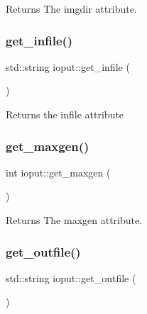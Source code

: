 \begin{DoxyReturn}{Returns}
The imgdir attribute. 
\end{DoxyReturn}
\mbox{\label{classioput_a7a165641e61846400db59840c5a6a160}} 
\subsubsection{\texorpdfstring{get\+\_\+infile()}{get\_infile()}}
{\footnotesize\ttfamily std\+::string ioput\+::get\+\_\+infile (\begin{DoxyParamCaption}{ }\end{DoxyParamCaption})\hspace{0.3cm}{\ttfamily [inline]}}

\begin{DoxyReturn}{Returns}
the infile attribute 
\end{DoxyReturn}
\mbox{\label{classioput_af5603ef96a4ae8db6f02d6d35227ac64}} 
\subsubsection{\texorpdfstring{get\+\_\+maxgen()}{get\_maxgen()}}
{\footnotesize\ttfamily int ioput\+::get\+\_\+maxgen (\begin{DoxyParamCaption}{ }\end{DoxyParamCaption})\hspace{0.3cm}{\ttfamily [inline]}}

\begin{DoxyReturn}{Returns}
The maxgen attribute. 
\end{DoxyReturn}
\mbox{\label{classioput_abdde82b7076a334519ada5f3a74d579a}} 
\subsubsection{\texorpdfstring{get\+\_\+outfile()}{get\_outfile()}}
{\footnotesize\ttfamily std\+::string ioput\+::get\+\_\+outfile (\begin{DoxyParamCaption}{ }\end{DoxyParamCaption})\hspace{0.3cm}{\ttfamily [inline]}}

